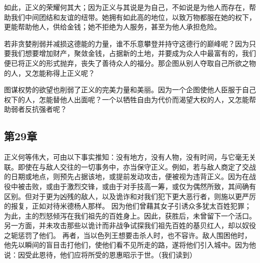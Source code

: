 如此，正义的荣耀何其大；因为正义与其说是为自己，不如说是为他人而存在，帮助我们中间团结和友谊的纽带。她拥有如此高的地位，以致万物都服在她的权下，更能帮助他人，供给金钱；她不拒绝为人服务，甚至为他人承担危险。\par

若非贪婪削弱并减损这德能的力量，谁不乐意攀登并持守这德行的巅峰呢？因为只要我们想要增加财产，聚敛金钱，占据新的土地，并要成为众人中最富有的，我们便已将正义的形式抛弃，丧失了善待众人的福分。那企图从别人夺取自己所欲之物的人，又怎能称得上正义呢？\par

图谋权势的欲望也削弱了正义的完美力量和美丽。因为一个企图使他人臣服于自己权下的人，怎能替他人出面呢？一个以牺牲自由为代价而渴望大权的人，又怎能帮助弱者反抗强者呢？\par


\subsection{第29章}

\par

正义何等伟大，可由以下事实推知：没有地方，没有人物，没有时间，与它毫无关联。即使在与敌人交往的一切事务中，亦当保守正义。例如，若与敌人商定了交战的日期或地点，则预先占据该地，或提前发动攻击，便被视为违背正义。因为在战役中被击败，或由于激烈交锋，或由于对手技高一筹，或仅为偶然所致，其间确有区别。但对于更为凶残的敌人，以及诡诈和对我们犯下更大恶行者，则施以更严厉的报复，正如对待米德杨人那样。 因为他们曾藉其女子引诱众多犹太百姓犯罪；为此，主的烈怒倾泻在我们祖先的百姓身上。因此，获胜后，未曾留下一个活口。另一方面，并未攻击那些以诡计而非战争试探我们祖先百姓的基贝红人，却以奴役之轭惩罚了他们。 再者，当以色列王想要击杀人时，也不容许。敌人围困他时，他先以瞬间的盲目击打他们，使他们看不见所走的路，遂将他们引入城中。因为他说：因受此恩待，他们应将所受的恩惠昭示于世。（我们读到）\par

